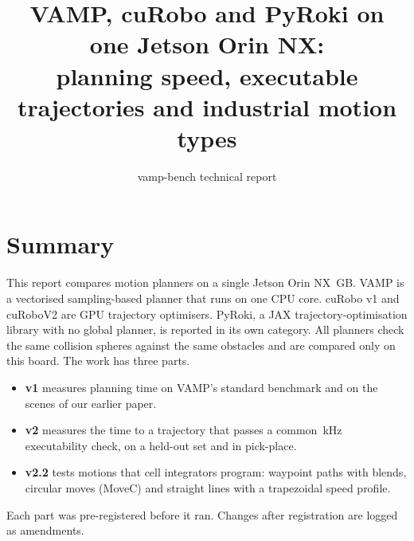\documentclass[11pt]{article}
\title{VAMP, cuRobo and PyRoki on one Jetson Orin NX:\\ planning speed, executable trajectories and industrial motion types}
\author{vamp-bench technical report}
\date{\reportDate}
\begin{document}
\maketitle

\section{Summary}
This report compares motion planners on a single Jetson Orin NX \boardMem\,GB. VAMP is a vectorised sampling-based planner that runs on one CPU core. cuRobo v1 and cuRoboV2 are GPU trajectory optimisers. PyRoki, a JAX trajectory-optimisation library with no global planner, is reported in its own category. All planners check the same collision spheres against the same obstacles and are compared only on this board. The work has three parts.
\begin{itemize}
  \item \textbf{v1} measures planning time on VAMP's standard benchmark and on the scenes of our earlier paper.
  \item \textbf{v2} measures the time to a trajectory that passes a common \gateHz\,kHz executability check, on a held-out set and in pick-place.
  \item \textbf{v2.2} tests motions that cell integrators program: waypoint paths with blends, circular moves (MoveC) and straight lines with a trapezoidal speed profile.
\end{itemize}
Each part was pre-registered before it ran. Changes after registration are logged as amendments.
\end{document}
